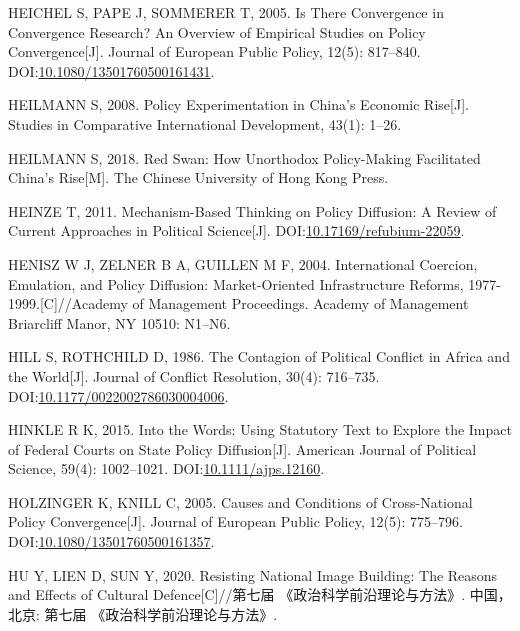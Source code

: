 \documentclass[
  12pt,
]{ctexart}
\newlength{\cslhangindent}
\newlength{\cslentryspacingunit} %
\newenvironment{CSLReferences}[2] %
 {%
  \setlength{\parindent}{0pt}
  \ifodd #1
  \let\oldpar\par
  \def\par{\hangindent=\cslhangindent\oldpar}
  \fi
  \setlength{\parskip}{#2\cslentryspacingunit}
 }%
 {}
\begin{document}
\begin{CSLReferences}{1}{0}
\leavevmode{}%
HEICHEL S, PAPE J, SOMMERER T, 2005. Is There Convergence in Convergence Research? An Overview of Empirical Studies on Policy Convergence{[}J{]}. Journal of European Public Policy, 12(5): 817--840. DOI:\href{https://doi.org/10.1080/13501760500161431}{10.1080/13501760500161431}.

\leavevmode{}%
HEILMANN S, 2008. Policy Experimentation in {China}'s Economic Rise{[}J{]}. Studies in Comparative International Development, 43(1): 1--26.

\leavevmode{}%
HEILMANN S, 2018. Red {Swan}: {How Unorthodox Policy-Making Facilitated China}'s {Rise}{[}M{]}. {The Chinese University of Hong Kong Press}.

\leavevmode{}%
HEINZE T, 2011. Mechanism-Based Thinking on Policy Diffusion: A Review of Current Approaches in Political Science{[}J{]}. DOI:\href{https://doi.org/10.17169/refubium-22059}{10.17169/refubium-22059}.

\leavevmode{}%
HENISZ W J, ZELNER B A, GUILLEN M F, 2004. International {Coercion}, {Emulation}, and {Policy Diffusion}: {Market-Oriented Infrastructure Reforms}, 1977-1999.{[}C{]}//Academy of {Management Proceedings}. {Academy of Management Briarcliff Manor, NY 10510}: N1--N6.

\leavevmode{}%
HILL S, ROTHCHILD D, 1986. The {Contagion} of {Political Conflict} in {Africa} and the {World}{[}J{]}. Journal of Conflict Resolution, 30(4): 716--735. DOI:\href{https://doi.org/10.1177/0022002786030004006}{10.1177/0022002786030004006}.

\leavevmode{}%
HINKLE R K, 2015. Into the {Words}: {Using Statutory Text} to {Explore} the {Impact} of {Federal Courts} on {State Policy Diffusion}{[}J{]}. American Journal of Political Science, 59(4): 1002--1021. DOI:\href{https://doi.org/10.1111/ajps.12160}{10.1111/ajps.12160}.

\leavevmode{}%
HOLZINGER K, KNILL C, 2005. Causes and Conditions of Cross-National Policy Convergence{[}J{]}. Journal of European Public Policy, 12(5): 775--796. DOI:\href{https://doi.org/10.1080/13501760500161357}{10.1080/13501760500161357}.

\leavevmode{}%
HU Y, LIEN D, SUN Y, 2020. Resisting {National Image Building}: {The Reasons} and {Effects} of {Cultural Defence}{[}C{]}//第七届 {《政治科学前沿理论与方法》}. {中国，北京}: {第七届 {《政治科学前沿理论与方法》}}.


\end{CSLReferences}
\end{document}
